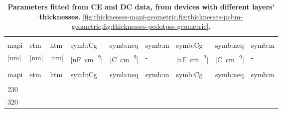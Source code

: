 \begin{xltabular}[c]{1.05\linewidth}{@{}>{\hsize}Y|>{\hsize}Y|>{\hsize}Y | Y >{\hsize}Y >{\hsize}Y | Y  >{\hsize}Y >{\hsize}Y @{}}
	\caption[Parameters fitted from CE and DC data, from devices with different layers' thicknesses.]{\textbf{Parameters fitted from CE and DC data, from devices with different layers' thicknesses.}
		 \cref{fig:thicknesses-mapi-geometric,fig:thicknesses-pcbm-geometric,fig:thicknesses-pedotpss-geometric}.
	}\label{table:thicknesses_photophysics}\\[\belowcaptionskip]
	 &  & 
	\rule[-1ex]{0pt}{3ex} \\
	\gls{mapi} &  \gls{etm} & \gls{htm} & \gls{symb:Cg} & \gls{symb:neq} &  \gls{symb:m} & \gls{symb:Cg} & \gls{symb:neq} &  \gls{symb:m} \\ 
	\rule[-1ex]{0pt}{2.5ex}  \footnotesize[\si{\nm}] &  \footnotesize[\si{\nm}] &  \footnotesize[\si{\nm}] & \footnotesize[\si{\nano\F\per\square\cm}] &  \footnotesize[\si{\coulomb\per\square\cm}] & - &  \footnotesize[\si{\nano\F\per\square\cm}] &  \footnotesize[\si{\coulomb\per\square\cm}] & - \\[1mm]
	\hline
	\endfirsthead
	\\
	\hline
	\gls{mapi} & \gls{etm} & \gls{htm} & \gls{symb:Cg} & \gls{symb:neq} &  \gls{symb:m} & \gls{symb:Cg} & \gls{symb:neq} &  \gls{symb:m} \\ 
	\hline
	\endhead
	\hline
	\\
	\endfoot
	\hline
	\endlastfoot
	\rule[-1ex]{0pt}{4ex}
	230 	& 	&  	& 	& 	& 	& 	& 	&  \\
	 
\rule[-1ex]{0pt}{4ex}
	320	&  						& 						& 	& 	& 	& 	& 	&  \\

\end{xltabular}
